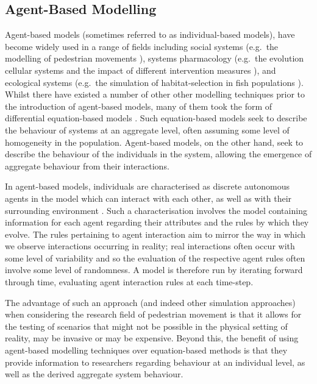 \subsection{Agent-Based Modelling}\label{sub:lt:abm}

Agent-based models (sometimes referred to as individual-based models), have
become widely used in a range of fields including social systems (e.g.\ the
modelling of pedestrian movements \citep{liu2014agent}), systems pharmacology
(e.g.\ the evolution cellular systems and the impact of different intervention
measures \citep{cosgrove2015agent}), and ecological systems (e.g.\ the simulation
of habitat-selection in fish populations \citep{railsback2002analysis}).
Whilst there have existed a number of other other modelling techniques prior to
the introduction of agent-based models, many of them took the form of
differential equation-based models \citep{parunak1998agent}.
Such equation-based models seek to describe the behaviour of systems at an
aggregate level, often assuming some level of homogeneity in the population. 
Agent-based models, on the other hand, seek to describe the behaviour of the
individuals in the system, allowing the emergence of aggregate behaviour from
their interactions.

In agent-based models, individuals are characterised as discrete autonomous
agents in the model which can interact with each other, as well as with their
surrounding environment \citep{bonabeau2002agent}.
Such a characterisation involves the model containing information for each agent
regarding their attributes and the rules by which they evolve.
The rules pertaining to agent interaction aim to mirror the way in which we
observe interactions occurring in reality; real interactions often occur with
some level of variability and so the evaluation of the respective agent rules
often involve some level of randomness.
A model is therefore run by iterating forward through time, evaluating agent
interaction rules at each time-step.

The advantage of such an approach (and indeed other simulation approaches) when
considering the research field of pedestrian movement is that it allows for the
testing of scenarios that might not be possible in the physical setting of
reality, may be invasive or may be expensive.
Beyond this, the benefit of using agent-based modelling techniques over
equation-based methods is that they provide information to researchers regarding
behaviour at an individual level, as well as the derived aggregate system
behaviour.

